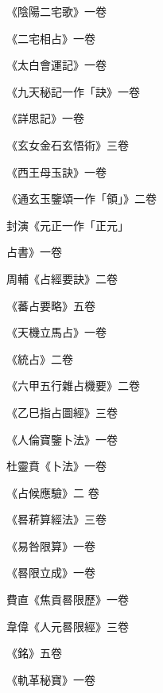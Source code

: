 \begin{pinyinscope}
 《陰陽二宅歌》一卷



 《二宅相占》一卷



 《太白會運記》一卷



 《九天秘記一作「訣》一卷



 《詳思記》一卷



 《玄女金石玄悟術》三卷



 《西王母玉訣》一卷



 《通玄玉鑒頌一作「領」》二卷



 封演《元正一作「正元」



 占書》一卷



 周輔《占經要訣》二卷



 《蕃占要略》五卷



 《天機立馬占》一卷



 《統占》二卷



 《六甲五行雜占機要》二卷



 《乙巳指占圖經》三卷



 《人倫寶鑒卜法》一卷



 杜靈賁《卜法》一卷



 《占候應驗》二
 卷



 《晷菥算經法》三卷



 《易咎限算》一卷



 《晷限立成》一卷



 費直《焦貢晷限歷》一卷



 韋偉《人元晷限經》三卷



 《銘》五卷



 《軌革秘寶》一卷




\end{pinyinscope}
